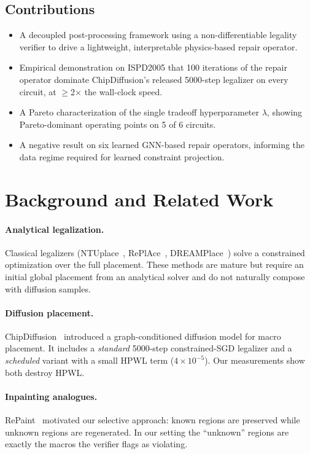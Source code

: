 \documentclass[conference]{IEEEtran}
\begin{document}
\subsection{Contributions}
\begin{itemize}
\item A decoupled post-processing framework using a non-differentiable legality verifier to drive a lightweight, interpretable physics-based repair operator.
\item Empirical demonstration on ISPD2005 that 100 iterations of the repair operator dominate ChipDiffusion's released 5000-step legalizer on every circuit, at $\geq$2$\times$ the wall-clock speed.
\item A Pareto characterization of the single tradeoff hyperparameter $\lambda$, showing Pareto-dominant operating points on 5 of 6 circuits.
\item A negative result on six learned GNN-based repair operators, informing the data regime required for learned constraint projection.
\end{itemize}

\section{Background and Related Work}

\paragraph{Analytical legalization.} Classical legalizers (NTUplace~\cite{ntuplace}, RePlAce~\cite{replace}, DREAMPlace~\cite{dreamplace}) solve a constrained optimization over the full placement. These methods are mature but require an initial global placement from an analytical solver and do not naturally compose with diffusion samples.

\paragraph{Diffusion placement.} ChipDiffusion~\cite{chipdiffusion} introduced a graph-conditioned diffusion model for macro placement. It includes a \emph{standard} 5000-step constrained-SGD legalizer and a \emph{scheduled} variant with a small HPWL term ($4\times 10^{-5}$). Our measurements show both destroy HPWL.

\paragraph{Inpainting analogues.} RePaint~\cite{repaint} motivated our selective approach: known regions are preserved while unknown regions are regenerated. In our setting the ``unknown'' regions are exactly the macros the verifier flags as violating.
\end{document}
